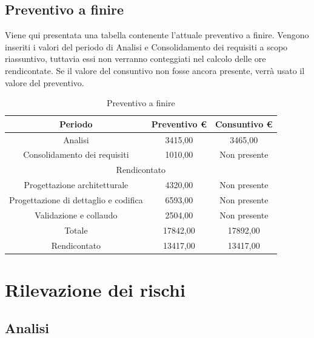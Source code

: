 \documentclass[./PianodiProgetto.tex]{subfiles}
\begin{document}
\section{Preventivo a finire}
Viene qui presentata una tabella contenente l'attuale preventivo a finire.
Vengono inseriti i valori del periodo di Analisi e Consolidamento dei requisiti
a scopo riassuntivo, tuttavia essi non verranno conteggiati nel calcolo delle
ore rendicontate. Se il valore del consuntivo non fosse ancora presente, verrà
usato il valore del preventivo.

\begin{table}[H]
	\centering
	\begin{tabular}{|c|c|c|}
		\hline
		Periodo&Preventivo \euro{}&Consuntivo \euro{} \\ \hline
		Analisi&3415,00&3465,00  \\ \hline
		Consolidamento dei requisiti&1010,00&Non presente  \\ \hline
		\multicolumn{3}{|c|}{Rendicontato}  \\ \hline
		Progettazione architetturale&4320,00&Non presente  \\ \hline
		Progettazione di dettaglio e codifica&6593,00&Non presente  \\ \hline
		Validazione e collaudo&2504,00&Non presente  \\ \hline
		Totale&17842,00&17892,00 \\ \hline
		Rendicontato&13417,00&13417,00 \\ \hline
	\end{tabular}
	\caption{Preventivo a finire}
\end{table}

\appendix


\appendix

\chapter{Rilevazione dei rischi}

\section{Analisi}
\end{document}

